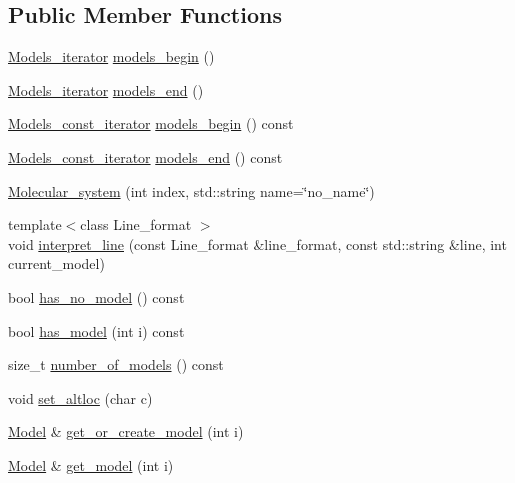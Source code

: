 \subsection*{Public Member Functions}
\begin{DoxyCompactItemize}
\item 
\hyperlink{group__grp__iters_ga752760df14baf1b92dac469d712202bc}{Models\+\_\+iterator} \hyperlink{group__grp__iters_gaed42cb1b0c025e5a74b231384dfe1632}{models\+\_\+begin} ()
\item 
\hyperlink{group__grp__iters_ga752760df14baf1b92dac469d712202bc}{Models\+\_\+iterator} \hyperlink{group__grp__iters_ga16244782639e3a6183da4a722162d534}{models\+\_\+end} ()
\item 
\hyperlink{group__grp__iters_ga6383c53b86af7a7a7376bce06e4febb8}{Models\+\_\+const\+\_\+iterator} \hyperlink{group__grp__iters_gae69a995db286b769fe7a8ae57658eb17}{models\+\_\+begin} () const
\item 
\hyperlink{group__grp__iters_ga6383c53b86af7a7a7376bce06e4febb8}{Models\+\_\+const\+\_\+iterator} \hyperlink{group__grp__iters_gab880e831a7b87fafec9ddf2e569b4cba}{models\+\_\+end} () const
\item 
\hyperlink{classESBTL_1_1Molecular__system_a21e3d9c75113838a77ddf56f3222614c}{Molecular\+\_\+system} (int index, std\+::string name=\char`\"{}no\+\_\+name\char`\"{})
\item 
{\footnotesize template$<$class Line\+\_\+format $>$ }\\void \hyperlink{classESBTL_1_1Molecular__system_a86cda10618aa2fd1730786fc4145acb2}{interpret\+\_\+line} (const Line\+\_\+format \&line\+\_\+format, const std\+::string \&line, int current\+\_\+model)
\item 
bool \hyperlink{classESBTL_1_1Molecular__system_a04ee4e4634a83c4dc8c84d3c9ef6a155}{has\+\_\+no\+\_\+model} () const
\item 
bool \hyperlink{classESBTL_1_1Molecular__system_a0a25e5aa6ec89a0746e1857bf7447ea7}{has\+\_\+model} (int i) const
\item 
size\+\_\+t \hyperlink{classESBTL_1_1Molecular__system_aa2dc1f2843ca6c182f50386502ec95e5}{number\+\_\+of\+\_\+models} () const
\item 
void \hyperlink{classESBTL_1_1Molecular__system_abc7e6c6b54f09eebeace5cc88bd2c981}{set\+\_\+altloc} (char c)
\item 
\hyperlink{classESBTL_1_1Molecular__system_ac99c9f22457fd0498324fb5cfc276227}{Model} \& \hyperlink{classESBTL_1_1Molecular__system_a2867e844dc082ca4a7a8072d541b034a}{get\+\_\+or\+\_\+create\+\_\+model} (int i)
\item 
\hyperlink{classESBTL_1_1Molecular__system_ac99c9f22457fd0498324fb5cfc276227}{Model} \& \hyperlink{classESBTL_1_1Molecular__system_ab7fb99d805c8d4cbe9fa770c12313bc0}{get\+\_\+model} (int i)
\end{DoxyCompactItemize}
